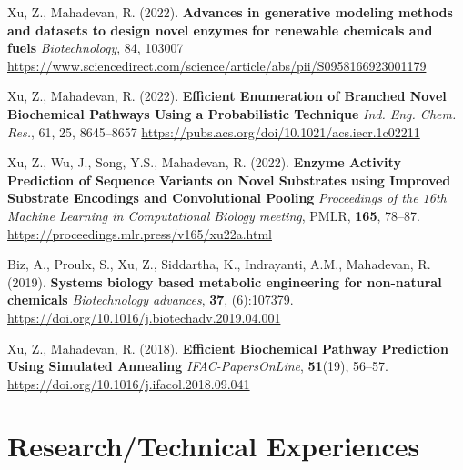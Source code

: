 \documentclass[a4paper,20pt]{article}
\newcommand{\resumeItem}[2]{
  \item\small{
    #1 {#2 \vspace{-2pt}}
  }
}
\newcommand{\resumeSubItem}[2]{\resumeItem{#1}{#2}\vspace{-2pt}}
\newenvironment{resumeItemList}{
    \begin{list}{}{ %
      \setlength{\leftmargin}{0em} %
      \setlength{\itemsep}{0.25em} %
    }
}{
    \end{list}
}
\newcommand{\resumeSubHeadingListStart}{}
\newcommand{\resumeSubHeadingListEnd}{}
\begin{document}
    \begin{resumeItemList}
    
        \resumeSubItem{}{Xu, Z., Mahadevan, R. (2022). \textbf{Advances in generative modeling methods and datasets to design novel enzymes for renewable chemicals and fuels} \textit{Biotechnology},  84, 103007 \url{https://www.sciencedirect.com/science/article/abs/pii/S0958166923001179}
        }

        \resumeSubItem{}{Xu, Z., Mahadevan, R. (2022). \textbf{Efficient Enumeration of Branched Novel Biochemical Pathways Using a Probabilistic Technique} \textit{Ind. Eng. Chem. Res.},  61, 25, 8645–8657 \url{https://pubs.acs.org/doi/10.1021/acs.iecr.1c02211}
        }
        
        \vspace{1pt}
        \resumeSubItem{}{Xu, Z., Wu, J., Song, Y.S., Mahadevan, R. (2022). \textbf{Enzyme Activity Prediction of Sequence Variants on Novel Substrates using Improved Substrate Encodings and Convolutional Pooling} \textit{Proceedings of the 16th Machine Learning in Computational Biology meeting}, PMLR, \textbf{165}, 78--87. \url{https://proceedings.mlr.press/v165/xu22a.html}
        }
        
        \vspace{1pt}
        \resumeSubItem{}{
        Biz, A., Proulx, S., Xu, Z., Siddartha, K., Indrayanti, A.M., Mahadevan, R. (2019). \textbf{Systems biology based metabolic engineering for non-natural chemicals} \textit{Biotechnology advances}, \textbf{37}, (6):107379. \url{https://doi.org/10.1016/j.biotechadv.2019.04.001}
        }
        
        \vspace{1pt}
        \resumeSubItem{}{Xu, Z., Mahadevan, R. (2018). \textbf{Efficient Biochemical Pathway Prediction Using Simulated Annealing} \textit{IFAC-PapersOnLine}, \textbf{51}(19), 56--57. \url{https://doi.org/10.1016/j.ifacol.2018.09.041}
        }
        
    \end{resumeItemList}
    
\resumeSubHeadingListEnd


\vspace{1pt}
\section{Research/Technical Experiences}
\resumeSubHeadingListStart
\end{document}
